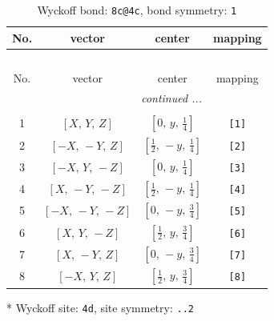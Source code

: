 \documentclass[fleqn,8pt]{jsarticle}
\begin{document}
\begin{longtable}{cccc}
\caption{Wyckoff bond: {\tt 8c@4c}, bond symmetry: {\tt 1}}
 \\
 \hline \hline
No. & vector & center & mapping \\ \hline \endfirsthead

\multicolumn{3}{l}{\tablename\ \thetable{}} \\
 \hline \hline
No. & vector & center & mapping \\ \hline \endhead

 \hline \hline
\multicolumn{3}{r}{\footnotesize\it continued ...} \\ \endfoot

 \hline \hline
\multicolumn{3}{r}{} \\ \endlastfoot

1 & $\left[ X,\, Y,\, Z \right]$ & $\left[ 0,\, y,\, \frac{1}{4} \right]$ & {\tt [1]} \\ \hline
2 & $\left[ - X,\, - Y,\, Z \right]$ & $\left[ \frac{1}{2},\, - y,\, \frac{1}{4} \right]$ & {\tt [2]} \\ \hline
3 & $\left[ - X,\, Y,\, - Z \right]$ & $\left[ 0,\, y,\, \frac{1}{4} \right]$ & {\tt [3]} \\ \hline
4 & $\left[ X,\, - Y,\, - Z \right]$ & $\left[ \frac{1}{2},\, - y,\, \frac{1}{4} \right]$ & {\tt [4]} \\ \hline
5 & $\left[ - X,\, - Y,\, - Z \right]$ & $\left[ 0,\, - y,\, \frac{3}{4} \right]$ & {\tt [5]} \\ \hline
6 & $\left[ X,\, Y,\, - Z \right]$ & $\left[ \frac{1}{2},\, y,\, \frac{3}{4} \right]$ & {\tt [6]} \\ \hline
7 & $\left[ X,\, - Y,\, Z \right]$ & $\left[ 0,\, - y,\, \frac{3}{4} \right]$ & {\tt [7]} \\ \hline
8 & $\left[ - X,\, Y,\, Z \right]$ & $\left[ \frac{1}{2},\, y,\, \frac{3}{4} \right]$ & {\tt [8]} \\
\end{longtable}
* Wyckoff site: {\tt 4d}, site symmetry: {\tt ..2}
\renewcommand{\arraystretch}{1.2}
\end{document}
